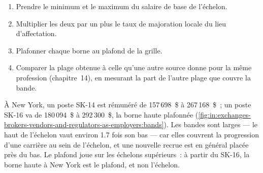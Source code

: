 \begin{method}\label{met:in:exchanges-brokers-vendors-and-regulators-as-employers:band}
\begin{enumerate}
\item Prendre le minimum et le maximum du salaire de base de l'échelon.
\item Multiplier les deux par un plus le taux de majoration locale du lieu d'affectation.
\item Plafonner chaque borne au plafond de la grille.
\item Comparer la plage obtenue à celle qu'une autre source donne pour la même profession (chapitre~14), en mesurant la
part de l'autre plage que couvre la bande.
\end{enumerate}
\end{method}

À New York, un poste SK-14 est rémunéré de 157\,698~\$ à 267\,168~\$~; un poste SK-16 va de 180\,094~\$ à 292\,300~\$, la borne haute
plafonnée (\cref{fig:in:exchanges-brokers-vendors-and-regulators-as-employers:bands}). Les bandes sont larges --- le haut de l'échelon
vaut environ 1.7 fois son bas --- car elles couvrent la progression d'une carrière au sein de l'échelon, et une nouvelle
recrue est en général placée près du bas. Le plafond joue sur les échelons supérieurs~: à partir du SK-16, la borne haute à New York est le plafond, et non
l'échelon.

\begin{omfigure}

\label{fig:in:exchanges-brokers-vendors-and-regulators-as-employers:bands}
\end{omfigure}

